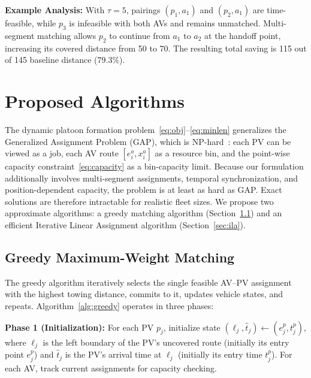 \documentclass[conference]{IEEEtran}
\begin{document}
\textbf{Example Analysis:} With $\tau=5$, pairings $(p_1,a_1)$ and $(p_2,a_1)$ are time-feasible, while $p_3$ is infeasible with both AVs and remains unmatched. Multi-segment matching allows $p_2$ to continue from $a_1$ to $a_2$ at the handoff point, increasing its covered distance from 50 to 70. The resulting total saving is 115 out of 145 baseline distance (79.3\%).

\section{Proposed Algorithms}
\label{sec:algorithms}

The dynamic platoon formation problem~\eqref{eq:obj}--\eqref{eq:minlen} generalizes the Generalized Assignment Problem (GAP), which is NP-hard~\cite{cattrysse1992survey}: each PV can be viewed as a job, each AV route $[e_i^a, x_i^a]$ as a resource bin, and the point-wise capacity constraint~\eqref{eq:capacity} as a bin-capacity limit. Because our formulation additionally involves multi-segment assignments, temporal synchronization, and position-dependent capacity, the problem is at least as hard as GAP. Exact solutions are therefore intractable for realistic fleet sizes. We propose two approximate algorithms: a greedy matching algorithm (Section~\ref{sec:greedy}) and an efficient Iterative Linear Assignment algorithm (Section~\ref{sec:ila}).

\subsection{Greedy Maximum-Weight Matching}
\label{sec:greedy}

The greedy algorithm iteratively selects the single feasible AV--PV assignment with the highest towing distance, commits to it, updates vehicle states, and repeats. %
Algorithm~\ref{alg:greedy} operates in three phases:

\textbf{Phase 1 (Initialization):} For each PV $p_j$, initialize state $(\ell_j, \hat{t}_j) \leftarrow (e_j^p, t_j^p)$, where $\ell_j$ is the left boundary of the PV's uncovered route (initially its entry point $e_j^p$) and $\hat{t}_j$ is the PV's arrival time at $\ell_j$ (initially its entry time $t_j^p$). For each AV, track current assignments for capacity checking.
\end{document}

